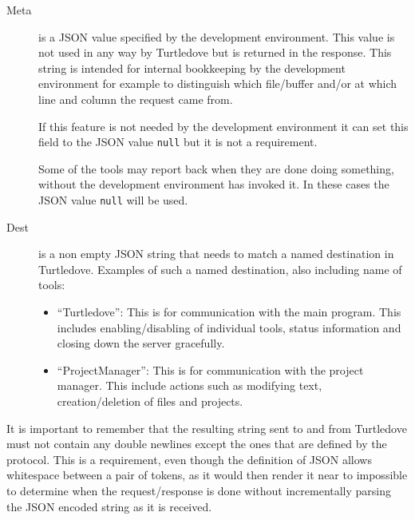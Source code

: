 \begin{description}
\item[Meta] is a JSON value specified by the development environment. This value
  is not used in any way by Turtledove but is returned in the response. This
  string is intended for internal bookkeeping by the development environment for
  example to distinguish which file/buffer and/or at which line and column the
  request came from.

  If this feature is not needed by the development environment it can set this
  field to the JSON value \texttt{null} but it is not a requirement.

  Some of the tools may report back when they are done doing something, without
  the development environment has invoked it. In these cases the JSON value
  \texttt{null} will be used.

\item[Dest] is a non empty JSON string that needs to match a named destination in
  Turtledove. Examples of such a named destination, also including name of
  tools:

  \begin{itemize}
  \item ``Turtledove'': This is for communication with the main program. This
    includes enabling/disabling of individual tools, status information and
    closing down the server gracefully.

  \item ``ProjectManager'': This is for communication with the project
    manager. This include actions such as modifying text, creation/deletion of
    files and projects.
  \end{itemize}
\end{description}


It is important to remember that the resulting string sent to and from
Turtledove must not contain any double newlines except the ones that are defined by
the protocol. This is a requirement, even though the definition of JSON allows
whitespace between a pair of tokens, as it would then render it near to
impossible to determine when the request/response is done without incrementally
parsing the JSON encoded string as it is received.

